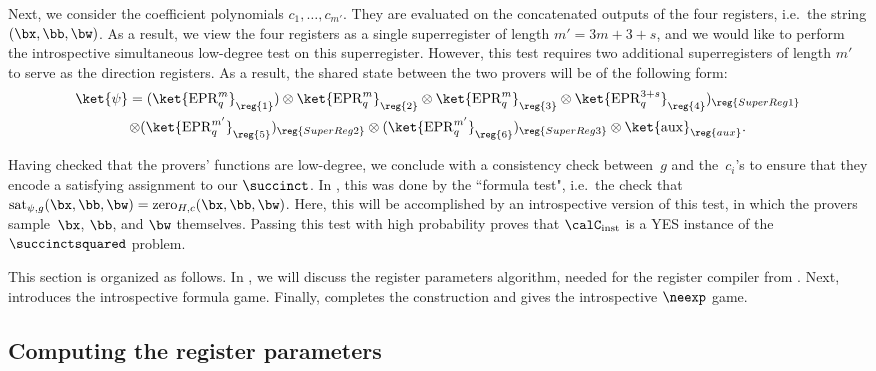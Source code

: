 Next, we consider the coefficient polynomials $c_1, \ldots, c_{m'}$.
They are evaluated on the concatenated outputs of the four registers, i.e.\ the string $(\bx, \bb, \bw)$.
As a result, we view the four registers as a single superregister of length $m' = 3 m + 3 + s$,
and we would like to perform the introspective simultaneous low-degree test on this superregister.
However, this test requires two additional superregisters of length $m'$ to serve as the direction registers.
As a result, the shared state between the two provers will be of the following form:
\begin{multline*}
\ket{\psi} = 
(\ket{\mathrm{EPR}_q^m}_{\reg{1}})
\otimes \ket{\mathrm{EPR}_q^m}_{\reg{2}}
\otimes \ket{\mathrm{EPR}_q^m}_{\reg{3}}
\otimes \ket{\mathrm{EPR}_q^{3+s}}_{\reg{4}})_{\reg{Super Reg 1}}\\
\otimes (\ket{\mathrm{EPR}_q^{m'}}_{\reg{5}})_{\reg{Super Reg 2}}
\otimes (\ket{\mathrm{EPR}_q^{m'}}_{\reg{6}})_{\reg{Super Reg 3}}
\otimes \ket{\mathrm{aux}}_{\reg{aux}}.
\end{multline*}

Having checked that the provers' functions are low-degree,
we conclude with a consistency check between~$g$ and the~$c_i$'s
to ensure that they encode a satisfying assignment to our $\succinct$.
In ,
this was done by the ``formula test",
i.e.\ the check that $\mathrm{sat}_{\psi, g}(\bx, \bb, \bw) = \mathrm{zero}_{H, c}(\bx, \bb, \bw)$.
Here, this will be accomplished by an introspective version of this test,
in which the provers sample~$\bx$, $\bb$, and $\bw$ themselves.
Passing this test with high probability proves
that $\calC_{\mathrm{inst}}$ is a YES instance of the $\succinctsquared$ problem.

This section is organized as follows.
In , we will discuss the register parameters algorithm,
needed for the register compiler from .
Next,  introduces the introspective formula game.
Finally,  completes the construction and gives the introspective $\neexp$ game.

\subsection{Computing the register parameters}\label{sec:computing-registers}

